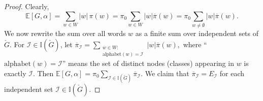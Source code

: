 \documentclass{llncs}
\begin{document}
\begin{proof}
Clearly, 
$$
\mathbb{E}[G,\alpha]=\sum_{w\in W}|w|\,\pi(w)=
\pi_0 \sum_{w\in W}|w|\overline{\pi}(w)
=
\pi_0 \sum_{w\neq\emptyset}|w|\overline{\pi}(w).
$$ 
We now rewrite the sum over all words $w$ as a finite sum over independent sets of $\check{G}$.  For $\mathcal{I}\in\mathbb{I}(\check{G})$, let 
$\overline{\pi}_{\mathcal{I}} =\sum_{\substack{w\in W:\\ \mathrm{alphabet}(w)=\mathcal{I}}} |w|\overline{\pi}(w),$ 
where “$\mathrm{alphabet}(w)=\mathcal{I}$” means the set of distinct nodes (classes) appearing in $w$ is exactly $\mathcal{I}$.  Then $\mathbb{E}[G,\alpha]=\pi_0\sum_{\mathcal{I}\in\mathbb{I}(\check{G})}\overline{\pi}_{\mathcal{I}}$.  We claim that $\overline{\pi}_{\mathcal{I}}=E_{\mathcal{I}}$ for each independent set $\mathcal{I}\in\mathbb{I}(\check{G})$. 


\end{proof}
\end{document}
